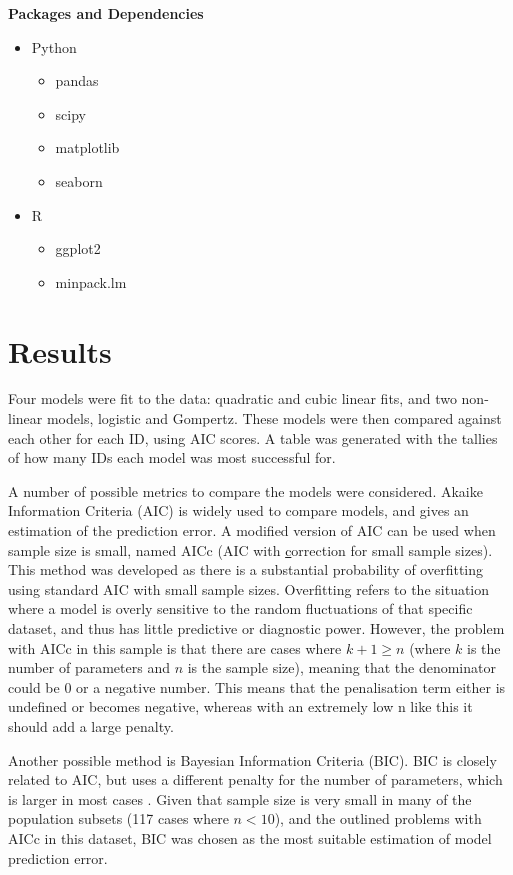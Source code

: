 \documentclass[11pt,a4wide,titlepage]{article}
\begin{document}
\noindent
\textbf{Packages and Dependencies}
\begin{itemize}
    \item Python
    \begin{itemize}
        \item pandas
        \item scipy
        \item matplotlib
        \item seaborn
    \end{itemize}
    \item R
    \begin{itemize}
        \item ggplot2
        \item minpack.lm
    \end{itemize}
\end{itemize}



\section*{Results}
Four models were fit to the data: quadratic and cubic linear fits, and two non-linear models, logistic and Gompertz. These models were then compared against each other for each ID, using AIC scores. A table was generated with the tallies of how many IDs each model was most successful for.

A number of possible metrics to compare the models were considered. Akaike Information Criteria (AIC) is widely used to compare models, and gives an estimation of the prediction error. A modified version of AIC can be used when sample size is small, named AICc (AIC with \underline{c}orrection for small sample sizes). This method was developed as there is a substantial probability of overfitting using standard AIC with small sample sizes. Overfitting refers to the situation where a model is overly sensitive to the random fluctuations of that specific dataset, and thus has little predictive or diagnostic power. However, the problem with AICc in this sample is that there are cases where $k + 1 \ge n$ (where $k$ is the number of parameters and $n$ is the sample size), meaning that the denominator could be 0 or a negative number. This means that the penalisation term either is undefined or becomes negative, whereas with an extremely low n like this it should add a large penalty.

Another possible method is Bayesian Information Criteria (BIC). BIC is closely related to AIC, but uses a different penalty for the number of parameters, which is larger in most cases \cite{stoicaModelorderSelectionReview2004}. Given that sample size is very small in many of the population subsets (117 cases where $n < 10$), and the outlined problems with AICc in this dataset, BIC was chosen as the most suitable estimation of model prediction error. 
\end{document}
